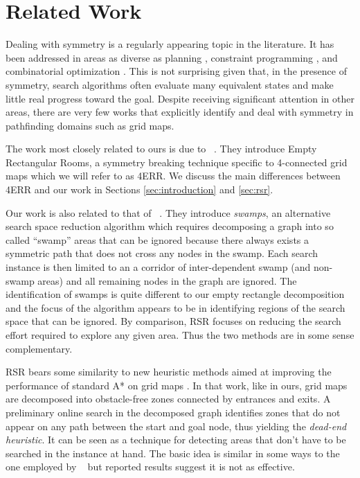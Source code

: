 \section{Related Work}
\label{sec:relatedwork}
Dealing with symmetry is a regularly appearing topic in the literature.  It has
been addressed in areas as diverse as planning \cite{fox99}, constraint programming
\cite{gent00}, and combinatorial optimization \cite{fukunaga08}.  This is not
surprising given that, in the presence of symmetry, search algorithms often
evaluate many equivalent states and make little real progress toward the goal.
Despite receiving significant attention in other areas, there are very few
works that explicitly identify and deal with symmetry in pathfinding domains 
such as grid maps. 
\par
The work most closely related to ours is due to
\citeauthor{harabor10}~.  They introduce Empty Rectangular
Rooms, a symmetry breaking technique specific to 4-connected grid maps which we
will refer to as 4ERR.  We discuss the main differences between 4ERR and our
work in Sections \ref{sec:introduction} and \ref{sec:rsr}.
\par
Our work is also related to that of
\citeauthor{pochter10}~.  They introduce \emph{swamps}, an
alternative search space reduction algorithm which requires decomposing a graph
into so called ``swamp'' areas that can be ignored because there always exists a
symmetric path that does not cross any nodes in the swamp.  Each search instance
is then limited to an a corridor of inter-dependent swamp (and non-swamp areas)
and all remaining nodes in the graph are ignored.  The identification of swamps
is quite different to our empty rectangle decomposition and the focus of the
algorithm appears to be in identifying regions of the search space that can be
ignored.  By comparison, RSR focuses on reducing the search effort required to
explore any given area.
Thus the two methods are in some sense complementary.
\par
RSR bears some similarity to new heuristic methods aimed at improving the
performance of standard A* on grid maps \cite{bjornsson06}.  In that work, like
in ours, grid maps are decomposed into obstacle-free zones connected by
entrances and exits.  A preliminary online search in the decomposed graph
identifies zones that do not appear on any path between the start and goal node,
thus yielding the \emph{dead-end heuristic}.  It can be seen as a technique for
detecting areas that don't have to be searched in the instance at hand.
The basic idea is similar in some ways to the one employed by
\citeauthor{pochter10}~ but reported results suggest it is
not as effective.


